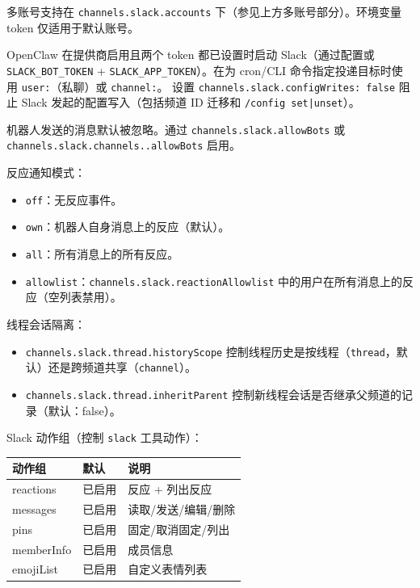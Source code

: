 多账号支持在 \texttt{channels.slack.accounts} 下（参见上方多账号部分）。环境变量 token 仅适用于默认账号。

OpenClaw 在提供商启用且两个 token 都已设置时启动 Slack（通过配置或 \texttt{SLACK\_BOT\_TOKEN} + \texttt{SLACK\_APP\_TOKEN}）。在为 cron/CLI 命令指定投递目标时使用 \texttt{user:}（私聊）或 \texttt{channel:}。
设置 \texttt{channels.slack.configWrites: false} 阻止 Slack 发起的配置写入（包括频道 ID 迁移和 \texttt{/config set|unset}）。

机器人发送的消息默认被忽略。通过 \texttt{channels.slack.allowBots} 或 \texttt{channels.slack.channels..allowBots} 启用。

反应通知模式：

\begin{itemize}
  \item \texttt{off}：无反应事件。
  \item \texttt{own}：机器人自身消息上的反应（默认）。
  \item \texttt{all}：所有消息上的所有反应。
  \item \texttt{allowlist}：\texttt{channels.slack.reactionAllowlist} 中的用户在所有消息上的反应（空列表禁用）。
\end{itemize}


线程会话隔离：

\begin{itemize}
  \item \texttt{channels.slack.thread.historyScope} 控制线程历史是按线程（\texttt{thread}，默认）还是跨频道共享（\texttt{channel}）。
  \item \texttt{channels.slack.thread.inheritParent} 控制新线程会话是否继承父频道的记录（默认：false）。
\end{itemize}


Slack 动作组（控制 \texttt{slack} 工具动作）：

\begin{table}[h]
\centering
\small
\begin{tabular}{|l|l|l|}
\hline
动作组 & 默认 & 说明 \\
\hline
reactions & 已启用 & 反应 + 列出反应 \\
\hline
messages & 已启用 & 读取/发送/编辑/删除 \\
\hline
pins & 已启用 & 固定/取消固定/列出 \\
\hline
memberInfo & 已启用 & 成员信息 \\
\hline
emojiList & 已启用 & 自定义表情列表 \\
\hline
\end{tabular}
\end{table}



